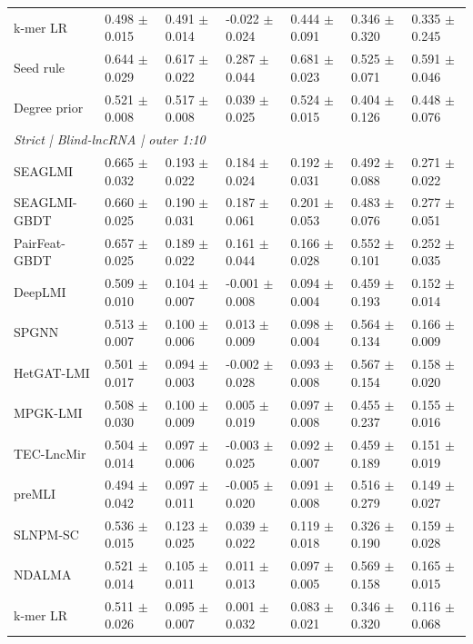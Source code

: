 \begin{landscape}
{\begin{longtable}{lllllll}
k-mer LR & 0.498 $\pm$ 0.015 & 0.491 $\pm$ 0.014 & -0.022 $\pm$ 0.024 & 0.444 $\pm$ 0.091 & 0.346 $\pm$ 0.320 & 0.335 $\pm$ 0.245 \\
Seed rule & 0.644 $\pm$ 0.029 & 0.617 $\pm$ 0.022 & 0.287 $\pm$ 0.044 & 0.681 $\pm$ 0.023 & 0.525 $\pm$ 0.071 & 0.591 $\pm$ 0.046 \\
Degree prior & 0.521 $\pm$ 0.008 & 0.517 $\pm$ 0.008 & 0.039 $\pm$ 0.025 & 0.524 $\pm$ 0.015 & 0.404 $\pm$ 0.126 & 0.448 $\pm$ 0.076 \\
\multicolumn{7}{l}{\textit{Strict | Blind-lncRNA | outer 1:10}}\\
SEAGLMI & 0.665 $\pm$ 0.032 & 0.193 $\pm$ 0.022 & 0.184 $\pm$ 0.024 & 0.192 $\pm$ 0.031 & 0.492 $\pm$ 0.088 & 0.271 $\pm$ 0.022 \\
SEAGLMI-GBDT & 0.660 $\pm$ 0.025 & 0.190 $\pm$ 0.031 & 0.187 $\pm$ 0.061 & 0.201 $\pm$ 0.053 & 0.483 $\pm$ 0.076 & 0.277 $\pm$ 0.051 \\
PairFeat-GBDT & 0.657 $\pm$ 0.025 & 0.189 $\pm$ 0.022 & 0.161 $\pm$ 0.044 & 0.166 $\pm$ 0.028 & 0.552 $\pm$ 0.101 & 0.252 $\pm$ 0.035 \\
DeepLMI & 0.509 $\pm$ 0.010 & 0.104 $\pm$ 0.007 & -0.001 $\pm$ 0.008 & 0.094 $\pm$ 0.004 & 0.459 $\pm$ 0.193 & 0.152 $\pm$ 0.014 \\
SPGNN & 0.513 $\pm$ 0.007 & 0.100 $\pm$ 0.006 & 0.013 $\pm$ 0.009 & 0.098 $\pm$ 0.004 & 0.564 $\pm$ 0.134 & 0.166 $\pm$ 0.009 \\
HetGAT-LMI & 0.501 $\pm$ 0.017 & 0.094 $\pm$ 0.003 & -0.002 $\pm$ 0.028 & 0.093 $\pm$ 0.008 & 0.567 $\pm$ 0.154 & 0.158 $\pm$ 0.020 \\
MPGK-LMI & 0.508 $\pm$ 0.030 & 0.100 $\pm$ 0.009 & 0.005 $\pm$ 0.019 & 0.097 $\pm$ 0.008 & 0.455 $\pm$ 0.237 & 0.155 $\pm$ 0.016 \\
TEC-LncMir & 0.504 $\pm$ 0.014 & 0.097 $\pm$ 0.006 & -0.003 $\pm$ 0.025 & 0.092 $\pm$ 0.007 & 0.459 $\pm$ 0.189 & 0.151 $\pm$ 0.019 \\
preMLI & 0.494 $\pm$ 0.042 & 0.097 $\pm$ 0.011 & -0.005 $\pm$ 0.020 & 0.091 $\pm$ 0.008 & 0.516 $\pm$ 0.279 & 0.149 $\pm$ 0.027 \\
SLNPM-SC & 0.536 $\pm$ 0.015 & 0.123 $\pm$ 0.025 & 0.039 $\pm$ 0.022 & 0.119 $\pm$ 0.018 & 0.326 $\pm$ 0.190 & 0.159 $\pm$ 0.028 \\
NDALMA & 0.521 $\pm$ 0.014 & 0.105 $\pm$ 0.011 & 0.011 $\pm$ 0.013 & 0.097 $\pm$ 0.005 & 0.569 $\pm$ 0.158 & 0.165 $\pm$ 0.015 \\
k-mer LR & 0.511 $\pm$ 0.026 & 0.095 $\pm$ 0.007 & 0.001 $\pm$ 0.032 & 0.083 $\pm$ 0.021 & 0.346 $\pm$ 0.320 & 0.116 $\pm$ 0.068 \\

\end{longtable}}
\end{landscape}
